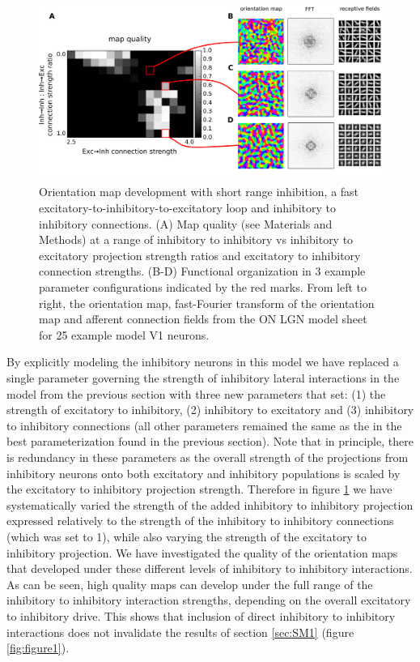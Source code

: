 \documentclass[utf8]{frontiersSCNS}
\begin{document}
\begin{figure}[htpb!] 
\centering
\includegraphics[width=16cm]{./SVG/Figure2/figure2.png}
\caption{Orientation map development with short range inhibition, a fast excitatory-to-inhibitory-to-excitatory loop and inhibitory to inhibitory connections. (A) Map quality (see Materials and Methods) at a range of 
inhibitory to inhibitory vs inhibitory to excitatory projection strength ratios and excitatory to inhibitory connection strengths. (B-D) Functional organization in 3 example parameter configurations 
indicated by the red marks. From left to right, the orientation map, fast-Fourier transform of the orientation map and afferent connection fields from the ON LGN model sheet for 25 example model V1 neurons. }
\label{fig:figure2}
\end{figure} 

By explicitly modeling the inhibitory neurons in this model we have replaced a single parameter governing the strength of inhibitory
lateral interactions in the model from the previous section with three new parameters that set: (1) the strength of excitatory to inhibitory,
(2) inhibitory to excitatory and (3) inhibitory to inhibitory connections (all other parameters remained the same as the 
in the best parameterization found in the previous section). Note that in principle, there is redundancy in these parameters as
the overall strength of the projections from inhibitory neurons onto both excitatory and inhibitory populations is scaled by the 
excitatory to inhibitory projection strength. Therefore in figure \ref{fig:figure2} we have systematically varied the strength of the added inhibitory to inhibitory
projection expressed relatively to the strength of the inhibitory to inhibitory connections (which was set to 1), while also varying the 
strength of the excitatory to inhibitory projection. We have investigated the quality of the orientation 
maps that developed under these different levels of inhibitory to inhibitory interactions. As can be seen, high quality maps 
can develop under the full range of the inhibitory to inhibitory interaction strengths, depending on the overall 
excitatory to inhibitory drive. This shows that inclusion of direct inhibitory to inhibitory interactions does not 
invalidate the results of section \ref{sec:SM1} (figure \ref{fig:figure1}).
\end{document}
